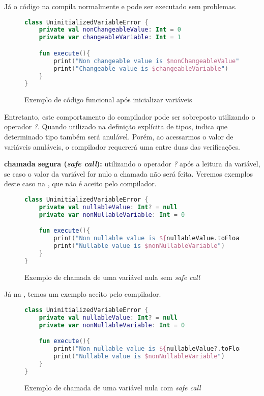 Já o código na  compila normalmente e pode ser executado sem problemas.

\begin{figure}[H]
    \centering
    \begin{lstlisting}[language=kotlin]
class UninitializedVariableError {
    private val nonChangeableValue: Int = 0
    private var changeableVariable: Int = 1

    fun execute(){
        print("Non changeable value is $nonChangeableValue")
        print("Changeable value is $changeableVariable")
    }
}
    \end{lstlisting}
    \caption{Exemplo de código funcional após inicializar variáveis}
    \label{fig:kotlin_init_variable}
\end{figure}

Entretanto, este comportamento do compilador pode ser sobreposto utilizando o operador \textit{?}. Quando utilizado na definição explícita de tipos, indica que determinado tipo também será anulável. Porém, ao acessarmos o valor de variáveis anuláveis, o compilador requererá uma entre duas das verificações.

\textbf{chamada segura (\textit{safe call}):} utilizando o operador \textit{?} após a leitura da variável, se caso o valor da variável for nulo a chamada não será feita. Veremos exemplos deste caso na , que não é aceito pelo compilador.

\begin{figure}[H]
    \centering
    \begin{lstlisting}[language=Kotlin]
class UninitializedVariableError {
    private val nullableValue: Int? = null
    private var nonNullableVariable: Int = 0

    fun execute(){
        print("Non nullable value is ${nullableValue.toFloat()}")
        print("Nullable value is $nonNullableVariable")
    }
}
    \end{lstlisting}
    \caption{Exemplo de chamada de uma variável nula sem \textit{safe call}}
    \label{fig:kotlin_null_variable_without_safe_call}
\end{figure}

Já na , temos um exemplo aceito pelo compilador.

\begin{figure}[H]
    \centering
    \begin{lstlisting}[language=Kotlin]
class UninitializedVariableError {
    private val nullableValue: Int? = null
    private var nonNullableVariable: Int = 0

    fun execute(){
        print("Non nullable value is ${nullableValue?.toFloat()}")
        print("Nullable value is $nonNullableVariable")
    }
}
    \end{lstlisting}
    \caption{Exemplo de chamada de uma variável nula com \textit{safe call}}
    \label{fig:kotlin_null_variable_with_safe_call}
\end{figure}

